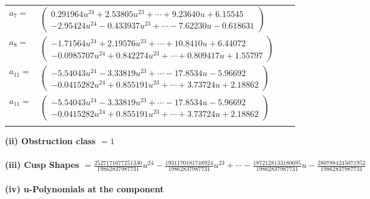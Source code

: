 \documentclass[1p]{elsarticle_modified}
\theoremstyle{definition}
\begin{document}
\begin{tabular}{m{7pt} m{180pt} m{7pt} m{180pt} }
\flushright $a_{7}=$&$\begin{pmatrix}0.291964 u^{24}+2.53805 u^{23}+\cdots+9.23640 u+6.15545\\-2.95424 u^{24}-0.433937 u^{23}+\cdots-7.62230 u-0.618631\end{pmatrix}$ \\
\flushright $a_{8}=$&$\begin{pmatrix}-1.71564 u^{24}+2.19576 u^{23}+\cdots+10.8410 u+6.44072\\-0.0985707 u^{24}+0.842274 u^{23}+\cdots+0.809417 u+1.55797\end{pmatrix}$ \\
\flushright $a_{11}=$&$\begin{pmatrix}-5.54043 u^{24}-3.33819 u^{23}+\cdots-17.8534 u-5.96692\\-0.0415282 u^{24}+0.855191 u^{23}+\cdots+3.73724 u+2.18862\end{pmatrix}$\\ \flushright $a_{11}=$&$\begin{pmatrix}-5.54043 u^{24}-3.33819 u^{23}+\cdots-17.8534 u-5.96692\\-0.0415282 u^{24}+0.855191 u^{23}+\cdots+3.73724 u+2.18862\end{pmatrix}$\\&\end{tabular}
\flushleft \textbf{(ii) Obstruction class $= 1$}\\~\\
\flushleft \textbf{(iii) Cusp Shapes $= \frac{2527171677251330}{19862837987731} u^{24}-\frac{1931170181748924}{19862837987731} u^{23}+\cdots-\frac{1872128133180695}{19862837987731} u-\frac{2807884245071952}{19862837987731}$}\\~\\
\newpage\renewcommand{\arraystretch}{1}
\flushleft \textbf{(iv) u-Polynomials at the component}\newline \\
\end{document}
